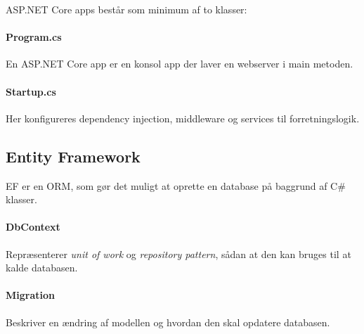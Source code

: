 ASP.NET Core apps består som minimum af to klasser:

\paragraph{Program.cs}
En ASP.NET Core app er en konsol app der laver en webserver i main metoden.

\paragraph{Startup.cs}
Her konfigureres dependency injection, middleware og services til forretningslogik.

\subsection{Entity Framework}
EF er en ORM, som gør det muligt at oprette en database på baggrund af C\# klasser.

\paragraph{DbContext}
Repræsenterer \textit{unit of work} og \textit{repository pattern}, sådan at den kan bruges til at kalde databasen.

\paragraph{Migration} Beskriver en ændring af modellen og hvordan den skal opdatere databasen.